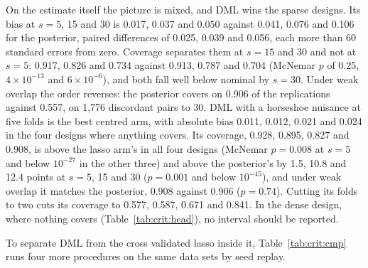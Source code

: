On the estimate itself the picture is mixed, and DML wins the sparse designs. Its bias at $s = 5$, 15 and 30 is 0.017, 0.037 and 0.050 against 0.041, 0.076 and 0.106 for the posterior, paired differences of 0.025, 0.039 and 0.056, each more than 60 standard errors from zero. Coverage separates them at $s = 15$ and 30 and not at $s = 5$: 0.917, 0.826 and 0.734 against 0.913, 0.787 and 0.704 (McNemar $p$ of 0.25, $4\times 10^{-13}$ and $6\times 10^{-6}$), and both fall well below nominal by $s = 30$. Under weak overlap the order reverses: the posterior covers on 0.906 of the replications against 0.557, on 1,776 discordant pairs to 30. DML with a horseshoe nuisance at five folds is the best centred arm, with absolute bias 0.011, 0.012, 0.021 and 0.024 in the four designs where anything covers. Its coverage, 0.928, 0.895, 0.827 and 0.908, is above the lasso arm's in all four designs (McNemar $p = 0.008$ at $s = 5$ and below $10^{-27}$ in the other three) and above the posterior's by 1.5, 10.8 and 12.4 points at $s = 5$, 15 and 30 ($p = 0.001$ and below $10^{-45}$), and under weak overlap it matches the posterior, 0.908 against 0.906 ($p = 0.74$). Cutting its folds to two cuts its coverage to 0.577, 0.587, 0.671 and 0.841. In the dense design, where nothing covers (Table~\ref{tab:crit:head}), no interval should be reported.

To separate DML from the cross validated lasso inside it, Table~\ref{tab:crit:cmp} runs four more procedures on the same data sets by seed replay.

